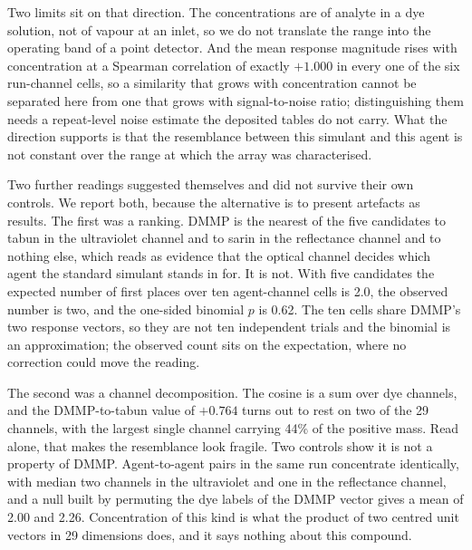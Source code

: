 \documentclass[journal=jacsat,manuscript=article,margin=1in]{achemso}
\begin{document}
Two limits sit on that direction. The concentrations are of analyte in a dye
solution, not of vapour at an inlet, so we do not translate the range into
the operating band of a point detector. And the mean response magnitude rises
with concentration at a Spearman correlation of exactly $+1.000$ in every one
of the six run-channel cells, so a similarity that grows with concentration
cannot be separated here from one that grows with signal-to-noise ratio;
distinguishing them needs a repeat-level noise estimate the deposited tables
do not carry. What the direction supports is that the resemblance between
this simulant and this agent is not constant over the range at which the
array was characterised.

Two further readings suggested themselves and did not survive their own
controls. We report both, because the alternative is to present artefacts as
results. The first was a ranking. DMMP is the nearest of the five candidates
to tabun in the ultraviolet channel and to sarin in the reflectance channel
and to nothing else, which reads as evidence that the optical channel decides
which agent the standard simulant stands in for. It is not. With five
candidates the expected number of first places over ten agent-channel cells
is 2.0, the observed number is two, and the one-sided binomial $p$ is 0.62.
The ten cells share DMMP's two response vectors, so they are not ten
independent trials and the binomial is an approximation; the observed count
sits on the expectation, where no correction could move the reading.

The second was a channel decomposition. The cosine is a sum over dye
channels, and the DMMP-to-tabun value of $+0.764$ turns out to rest on two
of the 29 channels, with the largest single channel carrying 44\% of the
positive mass. Read alone, that makes the resemblance look fragile. Two
controls show it is not a property of DMMP. Agent-to-agent pairs in the
same run concentrate identically, with median two channels in the
ultraviolet and one in the reflectance channel, and a null built by
permuting the dye labels of the DMMP vector gives a mean of 2.00 and 2.26.
Concentration of this kind is what the product of two centred unit vectors
in 29 dimensions does, and it says nothing about this compound.
\end{document}
